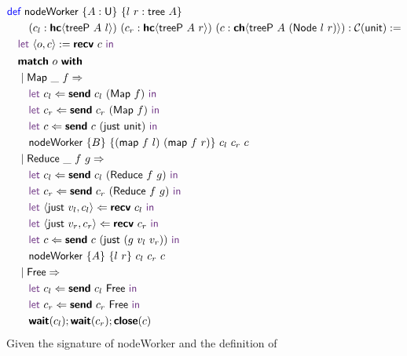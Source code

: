 \vspace{-1em}
\begingroup
\small
\addtolength{\jot}{-0.25em}
\begin{align*}
  &\Def\ \textsf{nodeWorker}\ \{A : \Un\}\ \{l\ r : \textsf{tree}\ A\}\\
  &\qquad(c_l : \HC{\textsf{treeP}\ A\ l})\ (c_r : \HC{\textsf{treeP}\ A\ r})\ (c : \CH{\textsf{treeP}\ A\ (\textsf{Node}\ l\ r)}) : \CM{\textsf{unit}} := \\
  &\quad\Let\ \langle{o, c}\rangle := \Recv\ c\ \In \\
  &\quad
    \begin{alignedat}{4}
      &\Match\ o\ \With\\
      &\mid \textsf{Map}\ \_\ f \Rightarrow \\
      &\quad\Let\ c_l \Leftarrow \Send\ c_l\ (\textsf{Map}\ f)\ \In \\
      &\quad\Let\ c_r \Leftarrow \Send\ c_r\ (\textsf{Map}\ f)\ \In \\
      &\quad\Let\ c \Leftarrow \Send\ c\ (\textsf{just}\ \textsf{unit})\ \In \\
      &\quad\textsf{nodeWorker}\ \{B\}\ \{(\textsf{map}\ f\ l)\ (\textsf{map}\ f\ r)\}\ c_l\ c_r\ c \\
      &\mid \textsf{Reduce}\ \_\ f\ g \Rightarrow \\
      &\quad\Let\ c_l \Leftarrow \Send\ c_l\ (\textsf{Reduce}\ f\ g)\ \In \\
      &\quad\Let\ c_r \Leftarrow \Send\ c_r\ (\textsf{Reduce}\ f\ g)\ \In \\
      &\quad\Let\ \langle{\textsf{just}\ v_l, c_l}\rangle \Leftarrow \Recv\ c_l\ \In \\
      &\quad\Let\ \langle{\textsf{just}\ v_r, c_r}\rangle \Leftarrow \Recv\ c_r\ \In \\
      &\quad\Let\ c \Leftarrow \Send\ c\ (\textsf{just}\ (g\ v_l\ v_r))\ \In \\
      &\quad\textsf{nodeWorker}\ \{A\}\ \{l\ r\}\ c_l\ c_r\ c \\
      &\mid \textsf{Free} \Rightarrow \\
      &\quad\Let\ c_l \Leftarrow \Send\ c_l\ \textsf{Free}\ \In \\
      &\quad\Let\ c_r \Leftarrow \Send\ c_r\ \textsf{Free}\ \In \\
      &\quad\Wait(c_l); \Wait(c_r); \Close(c)
    \end{alignedat}
\end{align*}
\endgroup
Given the signature of \textsf{nodeWorker} and the definition of
